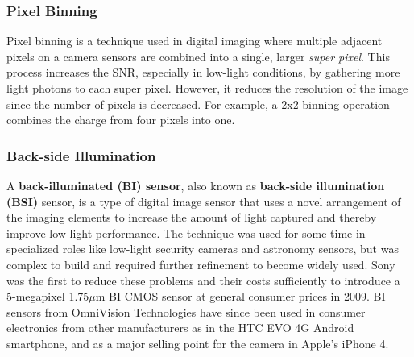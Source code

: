 \documentclass[10pt]{article}
\begin{document}
\begin{multicols}{2}
\subsubsection{Pixel Binning}
Pixel binning is a technique used in digital imaging where multiple adjacent pixels on a camera sensors are combined into a single, larger \textit{super pixel}. This process increases the SNR, especially in low-light conditions, by gathering more light photons to each super pixel. However, it reduces the resolution of the image since the number of pixels is decreased.
For example, a 2x2 binning operation combines the charge from four pixels into one.

\subsubsection{Back-side Illumination}
A \textbf{back-illuminated (BI) sensor},  also known as \textbf{back-side illumination (BSI)} sensor, is a type of digital image sensor that uses a novel arrangement of the imaging elements to increase the amount of light captured and thereby improve low-light performance.
\newline \newline
The technique was used for some time in specialized roles like low-light security cameras and astronomy sensors, but was complex to build and required further refinement to become widely used. Sony was the first to reduce these problems and their costs sufficiently to introduce a 5-megapixel 1.75$\mu$m BI CMOS sensor at general consumer prices in 2009.
BI sensors from OmniVision Technologies have since been used in consumer electronics from other manufacturers as in the HTC EVO 4G Android smartphone, and as a major selling point for the camera in Apple's iPhone 4.
\begin{figure}[H]
    \centering

\end{figure}
\end{multicols}
\end{document}
